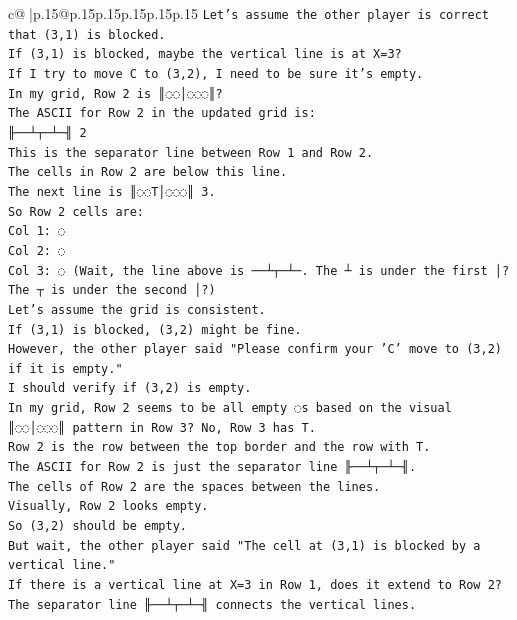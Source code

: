 \documentclass{article}
\begin{document}
{\begin{supertabular}{c@{$\;$}|p{.15\linewidth}@{}p{.15\linewidth}p{.15\linewidth}p{.15\linewidth}p{.15\linewidth}p{.15\linewidth}}
{{{\texttt{Let's assume the other player is correct that (3,1) is blocked.} \\
\texttt{If (3,1) is blocked, maybe the vertical line is at X=3?} \\
\texttt{If I try to move C to (3,2), I need to be sure it's empty.} \\
\texttt{In my grid, Row 2 is ║◌◌│◌◌◌║?} \\
\texttt{The ASCII for Row 2 in the updated grid is:} \\
\texttt{╟──┴┬─┴─╢ 2} \\
\texttt{This is the separator line between Row 1 and Row 2.} \\
\texttt{The cells in Row 2 are below this line.} \\
\texttt{The next line is ║◌◌T│◌◌◌║ 3.} \\
\texttt{So Row 2 cells are:} \\
\texttt{Col 1: ◌} \\
\texttt{Col 2: ◌} \\
\texttt{Col 3: ◌ (Wait, the line above is ──┴┬─┴─. The ┴ is under the first │? The ┬ is under the second │?)} \\
\texttt{Let's assume the grid is consistent.} \\
\texttt{If (3,1) is blocked, (3,2) might be fine.} \\
\texttt{However, the other player said "Please confirm your 'C' move to (3,2) if it is empty."} \\
\texttt{I should verify if (3,2) is empty.} \\
\texttt{In my grid, Row 2 seems to be all empty ◌s based on the visual ║◌◌│◌◌◌║ pattern in Row 3? No, Row 3 has T.} \\
\texttt{Row 2 is the row between the top border and the row with T.} \\
\texttt{The ASCII for Row 2 is just the separator line ╟──┴┬─┴─╢.} \\
\texttt{The cells of Row 2 are the spaces between the lines.} \\
\texttt{Visually, Row 2 looks empty.} \\
\texttt{So (3,2) should be empty.} \\
\texttt{But wait, the other player said "The cell at (3,1) is blocked by a vertical line."} \\
\texttt{If there is a vertical line at X=3 in Row 1, does it extend to Row 2?} \\
\texttt{The separator line ╟──┴┬─┴─╢ connects the vertical lines.} \\
}}}
\end{supertabular}}
\end{document}
